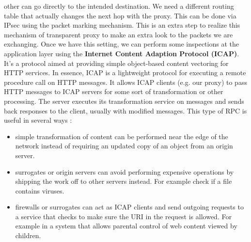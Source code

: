 \documentclass[11pt]{article}
\begin{document}
other can go directly to the intended destination. We need a different routing table that actually changes the next hop with the proxy. This can be done via IPsec using the packet marking mechanism. This is an extra step to realize this mechanism of transparent proxy to make an extra look to the packets we are exchanging. Once we have this setting, we can perform some inspections at the application layer using the \textbf{Internet Content Adaption Protocol (ICAP)}. It's a protocol aimed at providing simple object-based content vectoring for HTTP services. In essence, ICAP is a lightweight protocol for executing a remote procedure call on HTTP messages. It allows ICAP clients (e.g. our proxy) to pass HTTP messages to ICAP servers for some sort of transformation or other processing. The server executes its transformation service on messages and sends back responses to the client, usually with modified messages. This type of RPC is useful in several ways :
\begin{itemize}
\item simple transformation of content can be performed near the edge of the network instead of requiring an updated copy of an object from an origin server.
\item surrogates or origin servers can avoid performing expensive operations by shipping the work off to other servers instead. For example check if a file contains viruses.
\item firewalls or surrogates can act as ICAP clients and send outgoing requests to a service that checks to make sure the URI in the request is allowed. For example in a system that allows parental control of web content viewed by children.
\end{itemize}
\end{document}
